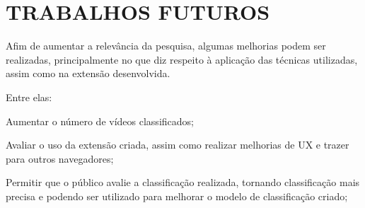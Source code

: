 \newpage
\section{TRABALHOS FUTUROS}

Afim de aumentar a relevância da pesquisa, algumas melhorias podem ser realizadas, principalmente no que diz respeito à aplicação das técnicas utilizadas, assim como na extensão desenvolvida.

Entre elas:

\begin{alineas}
    
    \item Aumentar o número de vídeos classificados;
    \item Avaliar o uso da extensão criada, assim como realizar melhorias de UX e trazer para outros navegadores;
    \item Permitir que o público avalie a classificação realizada, tornando classificação mais precisa e podendo ser utilizado para melhorar o modelo de classificação criado;
    
\end{alineas}

